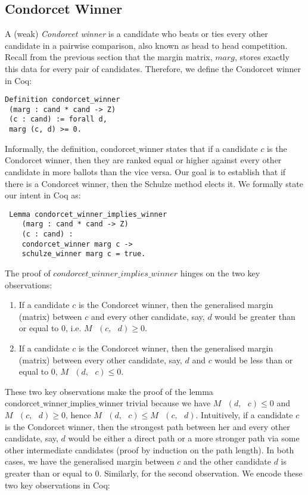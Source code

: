 \documentclass[compsoc,conference,a4paper,10pt,times]{IEEEtran}
\begin{document}
 
\subsection{Condorcet Winner}
	A (weak) \textit{Condorcet winner} is a candidate who beats or ties 
	every other candidate in a 
	pairwise comparison, also known as head to head competition. 
	Recall from the previous section that the margin matrix, $marg$, 
	stores exactly this data for every pair of candidates.
	Therefore, we define the Condorcet winner in Coq:

\begin{verbatim}
Definition condorcet_winner 
 (marg : cand * cand -> Z) 
 (c : cand) := forall d, 
 marg (c, d) >= 0.
\end{verbatim}

  Informally, the definition, $\mathrm{condorcet\_winner}$ states that 
  if a candidate $c$  is the Condorcet winner, then they are
  ranked equal or higher against
  every other candidate in more ballots than the vice versa. 
  Our goal is to establish that if there is a 
  Condorcet winner, then the Schulze method
  elects it. We formally state our intent 
  in Coq as:
 	
\begin{verbatim}
 Lemma condorcet_winner_implies_winner 
    (marg : cand * cand -> Z)
    (c : cand) : 
    condorcet_winner marg c -> 
    schulze_winner marg c = true. 

\end{verbatim}

  		
 The proof of $condorcet\_winner\_implies\_winner$ hinges on the two key observations:
 
 \begin{enumerate}
  \item If a candidate $c$ is the Condorcet winner, then the generalised margin (matrix) 
  between $c$
  and every other candidate, say, $d$ would be greater than or equal to 0, i.e. 
  $M \text{ } (c, \text{ }d) \geq 0$.
  
  \item If a candidate $c$ is the Condorcet winner, then the generalised margin  (matrix)
  between every other candidate, say, $d$ and $c$ would be less than or equal to 0, 
  $M \text{ } (d, \text{ }c) \leq 0$.
 \end{enumerate}
 
 
 These two key observations make the proof of the lemma
 $\mathrm{condorcet\_winner\_implies\_winner}$  
 trivial because we have $M \text{ } (d, \text{ }c) \leq 0$  and
  $M \text{ } (c, \text{ }d) \geq 0$, hence $M \text{ } (d, \text{ }c)  \leq 
   M \text{ } (c, \text{ }d)$. Intuitively, 
 if a candidate $c$ is the Condorcet winner, then the strongest path between her and every other 
 candidate, say, $d$ would be either a direct path or a more stronger path 
 via some other intermediate candidates (proof by induction on the path length). 
 In both cases, we have the generalised margin between 
 $c$ and the other candidate $d$ is greater than or equal to 0. 
 Similarly, for the second observation. We encode these two key observations in 
 Coq:
 
\end{document}
